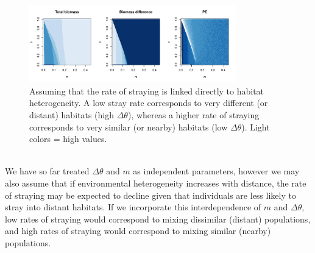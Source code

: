 \documentclass[twocolumn,preprintnumbers,amsmath,amssymb,superscriptaddress]{revtex4}
\begin{document}
\begin{figure}
  \captionsetup{justification=raggedright,
singlelinecheck=false
}
  \centering
  \includegraphics[width=0.8\textwidth]{figs/fig_MDPE_hm_mtheta.pdf}
  \caption{
  Assuming that the rate of straying is linked directly to habitat heterogeneity. A low stray rate corresponds to very different (or distant) habitats (high $\Delta\theta$), whereas a higher rate of straying corresponds to very similar (or nearby) habitats (low $\Delta\theta$). Light colors = high values.
  } \label{fig:mtheta}
\end{figure}








\\ 
\noindent We have so far treated $\Delta\theta$ and $m$ as independent parameters, however we may also assume that if environmental heterogeneity increases with distance, the rate of straying may be expected to decline given that individuals are less likely to stray into distant habitats. %
If we incorporate this interdependence of $m$ and $\Delta\theta$, low rates of straying would correspond to mixing dissimilar (distant) populations, and high rates of straying would correspond to mixing similar (nearby) populations.
\end{document}
